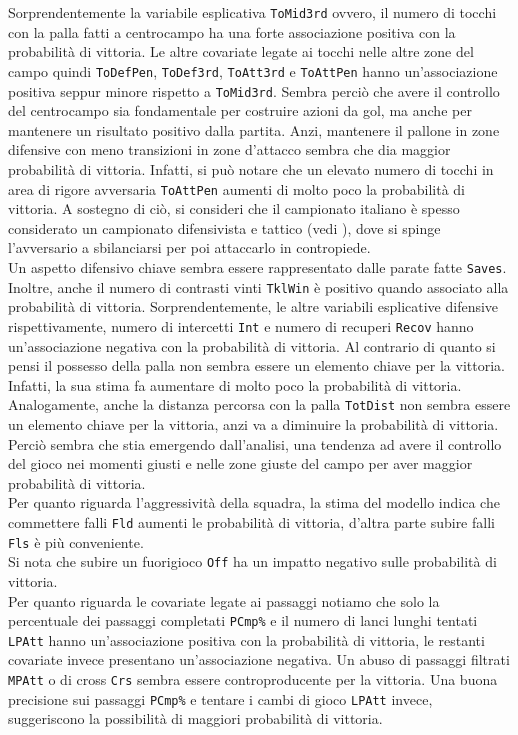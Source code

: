 Sorprendentemente la variabile esplicativa \texttt{ToMid3rd} ovvero, il numero di tocchi con la palla fatti a centrocampo ha una forte associazione positiva con la probabilità di vittoria. Le altre covariate legate ai tocchi nelle altre zone del campo quindi \texttt{ToDefPen}, \texttt{ToDef3rd}, \texttt{ToAtt3rd} e \texttt{ToAttPen} hanno un'associazione positiva seppur minore rispetto a \texttt{ToMid3rd}. Sembra perciò che avere il controllo del centrocampo sia fondamentale per costruire azioni da gol, ma anche per mantenere un risultato positivo dalla partita. Anzi, mantenere il pallone in zone difensive con meno transizioni in zone d'attacco sembra che dia maggior probabilità di vittoria. Infatti, si può notare che un elevato numero di tocchi in area di rigore avversaria \texttt{ToAttPen} aumenti di molto poco la probabilità di vittoria. A sostegno di ciò, si consideri che il campionato italiano è spesso considerato un campionato difensivista e tattico (vedi \textit{\cite{speculazione}}), dove si spinge l'avversario a sbilanciarsi per poi attaccarlo in contropiede.\\
Un aspetto difensivo chiave sembra essere rappresentato dalle parate fatte \texttt{Saves}. Inoltre, anche il numero di contrasti vinti \texttt{TklWin} è positivo quando associato alla probabilità di vittoria. Sorprendentemente, le altre variabili esplicative difensive rispettivamente, numero di intercetti \texttt{Int} e numero di recuperi \texttt{Recov} hanno un'associazione negativa con la probabilità di vittoria. Al contrario di quanto si pensi il possesso della palla non sembra essere un elemento chiave per la vittoria. Infatti, la sua stima fa aumentare di molto poco la probabilità di vittoria. Analogamente, anche la distanza percorsa con la palla \texttt{TotDist} non sembra essere un elemento chiave per la vittoria, anzi va a diminuire la probabilità di vittoria. Perciò sembra che stia emergendo dall'analisi, una tendenza ad avere il controllo del gioco nei momenti giusti e nelle zone giuste del campo per aver maggior probabilità di vittoria.\\
Per quanto riguarda l'aggressività della squadra, la stima del modello indica che commettere falli \texttt{Fld} aumenti le probabilità di vittoria, d'altra parte subire falli \texttt{Fls} è più conveniente.\\ 
Si nota che subire un fuorigioco \texttt{Off} ha un impatto negativo sulle probabilità di vittoria.\\
Per quanto riguarda le covariate legate ai passaggi notiamo che solo la percentuale dei passaggi completati \texttt{PCmp\%} e il numero di lanci lunghi tentati \texttt{LPAtt} hanno un’associazione positiva con la probabilità di vittoria, le restanti covariate invece presentano un'associazione negativa. Un abuso di passaggi filtrati \texttt{MPAtt} o di cross \texttt{Crs} sembra essere controproducente per la vittoria. Una buona precisione sui passaggi \texttt{PCmp\%} e tentare i cambi di gioco \texttt{LPAtt} invece, suggeriscono la possibilità di maggiori probabilità di vittoria. \\

